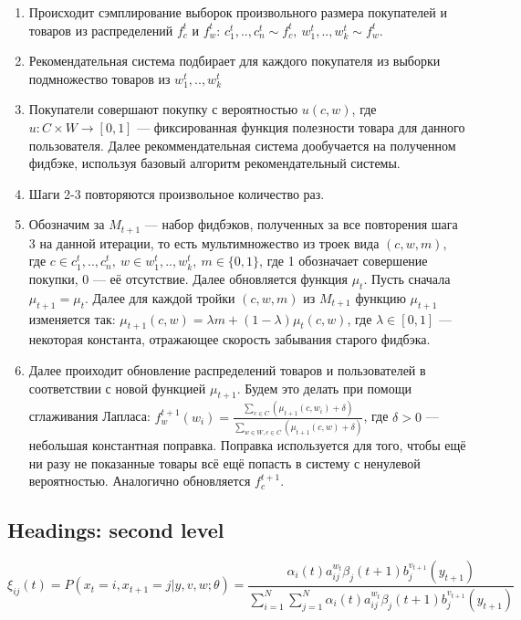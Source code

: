 \documentclass{article}
\begin{document}
\begin{enumerate}
\item Происходит сэмплирование выборок произвольного размера покупателей и товаров из распределений $f_c^t$ и $f_w^t$:
$c_1^t,..,c_n^t \sim f_c^t,\ w_1^t,..,w_k^t \sim f_w^t$.
\item Рекомендательная система подбирает для каждого покупателя из выборки подмножество товаров из $w_1^t,..,w_k^t$
\item Покупатели совершают покупку с вероятностью $u(c, w)$, где $u : C \times W \rightarrow [0, 1]$ --- фиксированная функция полезности товара для данного пользователя. Далее рекоммендательная система дообучается на полученном фидбэке, используя базовый алгоритм рекомендательный системы.
\item Шаги 2-3 повторяются произвольное количество раз.
\item Обозначим за $M_{t+1}$ --- набор фидбэков, полученных за все повторения шага 3 на данной итерации, то есть мультимножество из троек вида $(c, w, m)$, где $c \in {c_1^t,..,c_n^t},\ w \in {w_1^t,..,w_k^t},\ m \in \{0, 1\}$, где 1 обозначает совершение покупки, 0 --- её отсутствие. Далее обновляется функция $\mu_t$. Пусть сначала $\mu_{t + 1} = \mu_t$. Далее для каждой тройки $(c, w, m)$ из $M_{t+1}$ функцию $\mu_{t + 1}$ изменяется так: $\mu_{t + 1}(c, w) = \lambda m + (1 - \lambda)\mu_{t}(c, w)$, где $\lambda \in [0, 1]$ --- некоторая константа, отражающее скорость забывания старого фидбэка.
\item Далее проиходит обновление распределений товаров и пользователей в соответствии с новой функцией $\mu_{t + 1}$. Будем это делать при помощи сглаживания Лапласа:
$f_w^{t+1}(w_i) = \frac{\sum_{c \in C} (\mu_{t + 1}(c, w_i) + \delta)}{\sum_{w \in W, c \in C} (\mu_{t + 1}(c, w) + \delta)}$, где $\delta > 0$ --- небольшая константная поправка. Поправка используется для того, чтобы ещё ни разу не показанные товары всё ещё попасть в систему с ненулевой вероятностью. Аналогично обновляется $f_c^{t+1}$.
\end{enumerate}

\subsection{Headings: second level}
\lipsum[5]
\begin{equation}
	\xi _{ij}(t)=P(x_{t}=i,x_{t+1}=j|y,v,w;\theta)= {\frac {\alpha _{i}(t)a^{w_t}_{ij}\beta _{j}(t+1)b^{v_{t+1}}_{j}(y_{t+1})}{\sum _{i=1}^{N} \sum _{j=1}^{N} \alpha _{i}(t)a^{w_t}_{ij}\beta _{j}(t+1)b^{v_{t+1}}_{j}(y_{t+1})}}
\end{equation}
\end{document}
